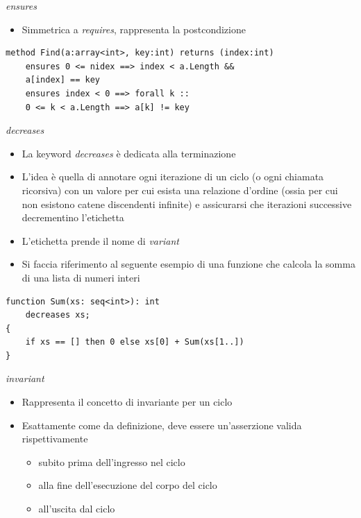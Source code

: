 \documentclass[]{beamer}
\begin{document}
\begin{frame}[containsverbatim]{\textit{ensures}}
\begin{itemize}
    \item Simmetrica a \textit{requires}, rappresenta la postcondizione
\end{itemize}    
\lstset{linewidth=11cm}
\begin{lstlisting}
method Find(a:array<int>, key:int) returns (index:int)
    ensures 0 <= nidex ==> index < a.Length && 
    a[index] == key
    ensures index < 0 ==> forall k :: 
    0 <= k < a.Length ==> a[k] != key
\end{lstlisting}
\end{frame}

\begin{frame}[containsverbatim]{\textit{decreases} }
    \begin{itemize}
        \item La keyword \textit{decreases} è dedicata alla terminazione
        \item L'idea è quella di annotare ogni iterazione di un ciclo (o ogni chiamata ricorsiva) con un valore per cui esista una relazione d'ordine (ossia per cui non esistono catene discendenti infinite) e assicurarsi che iterazioni successive decrementino l'etichetta
        \item L'etichetta prende il nome di \textit{variant}
        \item Si faccia riferimento al seguente esempio di una funzione che calcola la somma di una lista di numeri interi \cite{Decreases_ex}
    \end{itemize}
    \lstset{linewidth=11cm}
\begin{lstlisting}
function Sum(xs: seq<int>): int
    decreases xs;
{
    if xs == [] then 0 else xs[0] + Sum(xs[1..])
}
\end{lstlisting}
\end{frame}

\begin{frame}{\textit{invariant}}
    \begin{itemize}
        \item Rappresenta il concetto di invariante per un ciclo
        \item Esattamente come da definizione, deve essere un'asserzione valida rispettivamente \begin{itemize}
            \item subito prima dell'ingresso nel ciclo
            \item alla fine dell'esecuzione del corpo del ciclo
            \item all'uscita dal ciclo
        \end{itemize}
    \end{itemize}
\end{frame}
\end{document}
